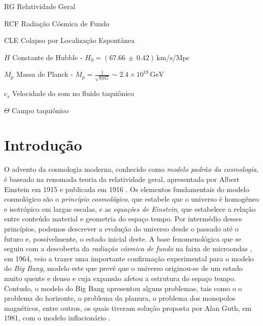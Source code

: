 \documentclass[
	12pt,				%
	openright,			%
	oneside,			%
	a4paper,			%
	english,			%
	french,				%
	spanish,			%
	brazil				%
	]{abntex2}
\begin{document}
\begin{siglas}
  \item[RG]  Relatividade Geral
  \item[RCF] Radiação Cósmica de Fundo
  \item[CLE] Colapso por Localização Espontânea
\end{siglas}

\begin{simbolos}
  \item[$ H $] Constante de Hubble - $H_{0} = ( 67.66\,\pm\, 0.42 )\,\mbox{km/s/Mpc}$
  \item[$ M_{p} $] Massa de Planck - $M_{p}=\frac{1}{\sqrt{8\pi G}}\sim 2.4\times 10^{18}\,\mbox{GeV}$
  \item[$ c_{s} $] Velocidade do som no fluido taquiônico
  \item[$ \Theta $] Campo taquiônico
\end{simbolos}

\tableofcontents*
\cleardoublepage



\textual

\chapter*[INTRODUÇÃO]{Introdução}
O advento da cosmologia moderna, conhecido como \emph{modelo padrão da cosmologia}, 
é baseado na renomada teoria da relatividade geral, apresentada por Albert Einstein 
em 1915 e publicada em 1916 \cite{EINSTEIN}. Os elementos fundamentais do modelo 
cosmológico são o \emph{princípio cosmológico}, que estabele que o universo é 
homogêneo e isotrópico em largas escalas, e as \emph{equações de Einstein}, que 
estabelece a relação entre conteúdo material e geometria do espaço tempo. Por intermédio desses 
princípios, podemos descrever a evolução do universo desde o passado até o futuro e,
possivelmente, o estado inicial deste. A base fenomenológica que se seguiu com a descoberta 
da \emph{radiação cósmica de fundo} na faixa de microondas \cite{PENZIAS}, em 1964, veio a trazer uma 
importante confirmação experimental para o modelo do \emph{Big Bang}, modelo este que prevê que o 
universo originou-se de um estado muito quente e denso e cuja expansão afetou a estrutura do espaço tempo.
Contudo, o modelo do Big Bang apresentou alguns problemas, tais como o o problema do horizonte, o problema da 
planura, o problema dos monopolos magnéticos, entre outros, os quais tiveram solução proposta por Alan Guth, 
em 1981, com o modelo inflacionário \cite{GUTH}.
\end{document}
